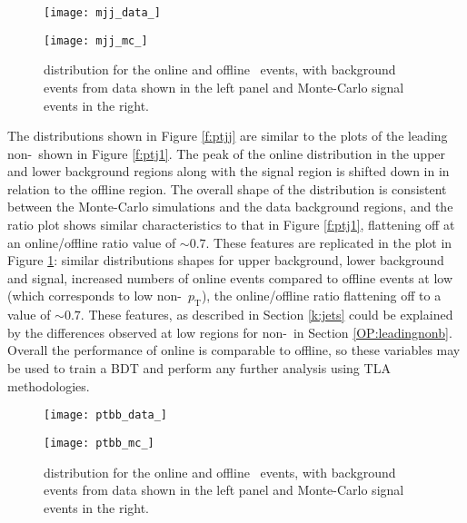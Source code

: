         \begin{figure}[h]
            \centering
            \begin{minipage}[h]{0.48\linewidth}
                \texttt{[image: mjj\_data\_]}
            \end{minipage}
            \quad
            \begin{minipage}[h]{0.48\linewidth}
                \texttt{[image: mjj\_mc\_]}
            \end{minipage}
            \caption[Comparison of the \mjj distribution of the \VBFHBB\ events for HLT and offline objects]{\mjj distribution for the online and offline \VBFHBB\ events, with background events from data shown in the left panel and Monte-Carlo signal events in the right.}
            \label{f:mjj}
        \end{figure}

        The \ptjj distributions shown in Figure \ref{f:ptjj} are similar to the plots of the leading non-\bjet\ shown in Figure \ref{f:ptj1}. The peak of the online distribution in the upper and lower background regions along with the signal region is shifted down in \ptjj in relation to the offline region. The overall shape of the distribution is consistent between the Monte-Carlo simulations and the data background regions, and the ratio plot shows similar characteristics to that in Figure \ref{f:ptj1}, flattening off at an online/offline ratio value of $\sim0.7$. These features are replicated in the \mjj plot in Figure \ref{f:mjj}: similar distributions shapes for upper background, lower background and signal, increased numbers of online events compared to offline events at low \mjj (which corresponds to low non-\bjet\ $p_\text{T}$), the online/offline ratio flattening off to a value of $\sim0.7$. These features, as described in Section \ref{k:jets} could be explained by the differences observed at low \pt regions for non-\bjets\ in Section \ref{OP:leadingnonb}. Overall the performance of online is comparable to offline, so these variables may be used to train a BDT and perform any further analysis using TLA methodologies.

        \begin{figure}[h]
            \centering
            \begin{minipage}[h]{0.48\linewidth}
                \texttt{[image: ptbb\_data\_]}
            \end{minipage}
            \quad
            \begin{minipage}[h]{0.48\linewidth}
                \texttt{[image: ptbb\_mc\_]}
            \end{minipage}
            \caption[Comparison of the \ptbb distribution of the \VBFHBB\ events for HLT and offline objects]{\ptbb distribution for the online and offline \VBFHBB\ events, with background events from data shown in the left panel and Monte-Carlo signal events in the right.}
            \label{f:ptbb}
        \end{figure}

